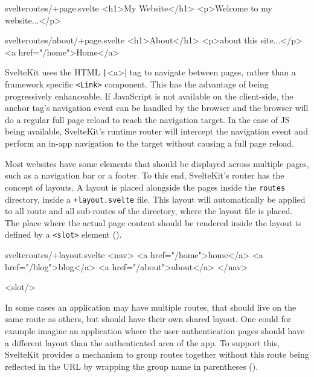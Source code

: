 \begin{listing}[h!]
\begin{myminted}{svelte}{routes/+page.svelte}
<h1>My Website</h1>
<p>Welcome to my website...</p>
\end{myminted}
\begin{myminted}{svelte}{routes/about/+page.svelte}
<h1>About</h1>
<p>about this site...</p>
<a href="/home">Home</a>
\end{myminted}
\caption{Example page definitions in SvelteKit.}
\label{fig:sveltekit-page-file}
\end{listing}

SvelteKit uses the HTML \texttt|<a>| tag to navigate between pages, rather than a framework specific \texttt{<Link>} component. This has the advantage of being progressively enhanceable. If JavaScript is not available on the client-side, the anchor tag's navigation event can be handled by the browser and the browser will do a regular full page reload to reach the navigation target. In the case of JS being available, SvelteKit's runtime router will intercept the navigation event and perform an in-app navigation to the target without causing a full page reload.

Most websites have some elements that should be displayed across multiple pages, such as a navigation bar or a footer. To this end, SvelteKit's router has the concept of layouts. A layout is placed alongside the pages inside the \texttt{routes} directory, inside a \texttt{+layout.svelte} file. This layout will automatically be applied to all route and all sub-routes of the directory, where the layout file is placed. The place where the actual page content should be rendered inside the layout is defined by a \texttt{<slot>} element ().

\begin{listing}[h!]
\begin{myminted}{svelte}{routes/+layout.svelte}
<nav>
  <a href="/home">home</a>
  <a href="/blog">blog</a>
  <a href="/about">about</a>
</nav>

<slot/>
\end{myminted}
\caption{Example for a layout that provides a navigation bar.}
\label{fig:sveltekit-layout}
\end{listing}

In some cases an application may have multiple routes, that should live on the same route as others, but should have their own shared layout. One could for example imagine an application where the user authentication pages should have a different layout than the authenticated area of the app. To support this, SvelteKit provides a mechanism to group routes together without this route being reflected in the URL by wrapping the group name in parentheses ().

